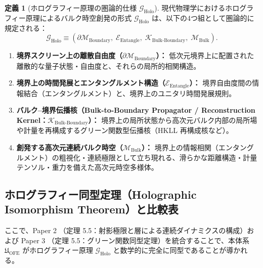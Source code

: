 \documentclass[11pt,a4paper]{ltjsarticle}
\theoremstyle{definition}
\newtheorem{definition}{定義}[section]
\theoremstyle{plain}
\begin{document}
\begin{definition}[ホログラフィー原理の圏論的仕様 $\mathcal{G}_{\mathrm{Holo}}$]
現代物理学におけるホログラフィー原理によるバルク時空創発の形式 $\mathcal{G}_{\mathrm{Holo}}$ は、以下の4つ組として圏論的に規定される：
\[
\mathcal{G}_{\mathrm{Holo}} \equiv \left(\partial\mathcal{M}_{\mathrm{Boundary}},\; \mathcal{E}_{\mathrm{Entangle}},\; \mathcal{K}_{\mathrm{Bulk\text{-}Boundary}},\; \mathcal{M}_{\mathrm{Bulk}}\right).
\]
\begin{enumerate}
    \item \textbf{境界スクリーン上の離散自由度（$\partial\mathcal{M}_{\mathrm{Boundary}}$）：} 低次元境界上に配置された離散的な量子状態・自由度と、それらの局所的相関構造。
    \item \textbf{境界上の時間発展とエンタングルメント構造（$\mathcal{E}_{\mathrm{Entangle}}$）：} 境界自由度間の情報結合（エンタングルメント）と、境界上のユニタリ時間発展規則。
    \item \textbf{バルク–境界伝播核（Bulk-to-Boundary Propagator / Reconstruction Kernel：$\mathcal{K}_{\mathrm{Bulk\text{-}Boundary}}$）：} 境界上の局所状態から高次元バルク内部の局所場や計量を再構成するグリーン関数型伝播核（HKLL 再構成核など）。
    \item \textbf{創発する高次元連続バルク時空（$\mathcal{M}_{\mathrm{Bulk}}$）：} 境界上の情報相関（エンタングルメント）の粗視化・連続極限として立ち現れる、滑らかな距離構造・計量テンソル・重力を備えた高次元時空多様体。
\end{enumerate}
\end{definition}

\subsection{ホログラフィー同型定理（Holographic Isomorphism Theorem）と比較表}
ここで、Paper 2 \cite{Ota2026_2}（定理 5.5：射影極限と層による連続ダイナミクスの構成）および Paper 3 \cite{Ota2026_3}（定理 5.5：グリーン関数同型定理）を統合することで、本体系 $\mathfrak{U}_{\mathrm{OFE}}$ がホログラフィー原理 $\mathcal{G}_{\mathrm{Holo}}$ と数学的に完全に同型であることが導かれる。
\end{document}
